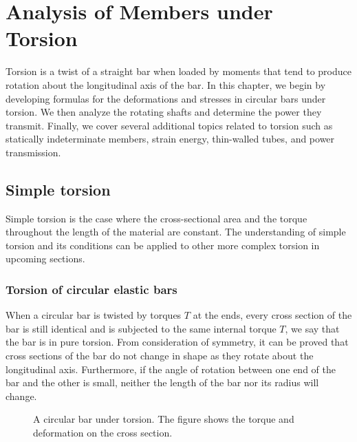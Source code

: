 \documentclass[
10pt,
a4paper,
openany,
svgnames,
]{book} %
\begin{document}
\chapter{Analysis of Members under Torsion}

Torsion is a twist of a straight bar when loaded by moments that tend to produce rotation about the longitudinal axis of the bar. In this chapter, we begin by developing formulas for the deformations and stresses in circular bars under torsion. We then analyze the rotating shafts and determine the power they transmit. Finally, we cover several additional topics related to torsion such as statically indeterminate members, strain energy, thin-walled tubes, and power transmission.

\section{Simple torsion}

Simple torsion is the case where the cross-sectional area and the torque throughout the length of the material are constant. The understanding of simple torsion and its conditions can be applied to other more complex torsion in upcoming sections.

\subsection{Torsion of circular elastic bars}

When a circular bar is twisted by torques $T$ at the ends, every cross section of the bar is still identical and is subjected to the same internal torque $T$, we say that the bar is in pure torsion. From consideration of symmetry, it can be proved that cross sections of the bar do not change in shape as they rotate about the longitudinal axis. Furthermore, if the angle of rotation between one end of the bar and the other is small, neither the length of the bar nor its radius will change.

\begin{figure}[h]
  \centering
  \caption{A circular bar under torsion. The figure shows the torque and deformation on the cross section.}
  \label{fig: 3d torsional deformation}
\end{figure}
\end{document}

